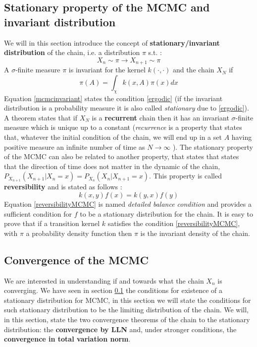 \documentclass[12pt,mythesisstyle]{report}
\begin{document}
\subsection{Stationary property of the MCMC and invariant distribution}\label{section: InvariantDistribMCMC}
We will in this section introduce the concept of \textbf{stationary/invariant distribution} of the chain, i.e. a distribution $\pi$ s.t. \cite{RobertCasella}:
\begin{equation}\label{ergodic}
X_{n} \sim \pi \rightarrow X_{n+1} \sim \pi
\end{equation}
A $\sigma$-finite measure $\pi$ is invariant for the kernel $k(\cdot,\cdot)$ and the chain $X_N$ if
\begin{equation}\label{mcmcinvariant}
\pi(A)=\int_{\chi} k(x,A)\pi(x)dx
\end{equation}
Equation \eqref{mcmcinvariant} states the condition \eqref{ergodic} (if the invariant distribution is a probability measure it is also called \textit{stationary} due to \eqref{ergodic}). A theorem states \cite{RobertCasella} that if $X_N$ is a \textbf{recurrent} chain then it has an invariant $\sigma$-finite measure which is unique up to a constant (\textit{recurrence} is a property that states that, whatever the initial condition of the chain, we will end up in a set $A$ having positive measure an infinite number of time as $N\rightarrow \infty$ \cite{RobertCasella}). The stationary property of the MCMC can also be related to another property, that states that states that the direction of time does not matter in the dynamic of the chain, $P_{X_{n+1}}(X_{n+1}|X_n=x)=P_{X_{n}}(X_{n}|X_{n+1}=x)$. This property is called \textbf{reversibility} and is stated as follows \cite{mcmcnotes} \cite{RobertCasella}:
\begin{equation}\label{reversibilityMCMC}
k(x,y)f(x)=k(y,x)f(y)
\end{equation} 
Equation \eqref{reversibilityMCMC} is named \textit{detailed balance condition} and provides a sufficient condition for $f$ to be a stationary distribution for the chain. It is easy to prove that \cite{RobertCasella} if a transition kernel $k$ satisfies the condition \eqref{reversibilityMCMC}, with $\pi$ a probability density function then $\pi$ is the invariant density of the chain.

\subsection{Convergence of the MCMC}
We are interested in understanding if and towards what the chain $X_n$ is converging. We have seen in section \ref{section: InvariantDistribMCMC} the conditions for existence of a stationary distribution for MCMC, in this section we will state the conditions for such stationary distribution to be the limiting distribution of the chain. We will, in this section, state the two convergence theorems of the chain to the stationary distribution: the \textbf{convergence by LLN} and, under stronger conditions, the \textbf{convergence in total variation norm}.
\end{document}
